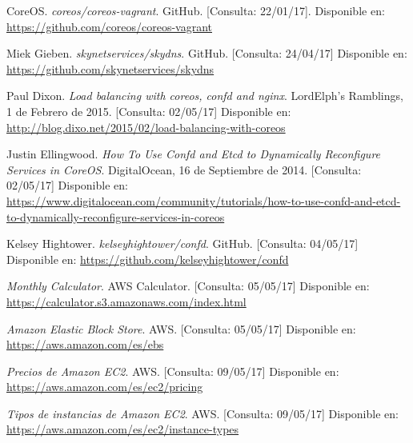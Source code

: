 \begin{thebibliography}{9}
CoreOS.
\textit{coreos/coreos-vagrant}. GitHub. [Consulta: 22/01/17].
Disponible en: \url{https://github.com/coreos/coreos-vagrant}

Miek Gieben.
\textit{skynetservices/skydns}. GitHub. [Consulta: 24/04/17]
Disponible en: \url{https://github.com/skynetservices/skydns}

Paul Dixon.
\textit{Load balancing with coreos, confd and nginx}. 
LordElph's Ramblings, 1 de Febrero de 2015. [Consulta: 02/05/17]
Disponible en: \url{http://blog.dixo.net/2015/02/load-balancing-with-coreos}

Justin Ellingwood.
\textit{How To Use Confd and Etcd to Dynamically Reconfigure Services in CoreOS}. 
DigitalOcean, 16 de Septiembre de 2014. [Consulta: 02/05/17]
Disponible en: \url{https://www.digitalocean.com/community/tutorials/how-to-use-confd-and-etcd-to-dynamically-reconfigure-services-in-coreos}

Kelsey Hightower.
\textit{kelseyhightower/confd}. GitHub. [Consulta: 04/05/17]
Disponible en: \url{https://github.com/kelseyhightower/confd}

\textit{Monthly Calculator}. 
AWS Calculator. [Consulta: 05/05/17]
Disponible en: \url{https://calculator.s3.amazonaws.com/index.html}

\textit{Amazon Elastic Block Store}. 
AWS. [Consulta: 05/05/17]
Disponible en: \url{https://aws.amazon.com/es/ebs}

\textit{Precios de Amazon EC2}. 
AWS. [Consulta: 09/05/17]
Disponible en: \url{https://aws.amazon.com/es/ec2/pricing}

\textit{Tipos de instancias de Amazon EC2}. 
AWS. [Consulta: 09/05/17]
Disponible en: \url{https://aws.amazon.com/es/ec2/instance-types}


\end{thebibliography}


